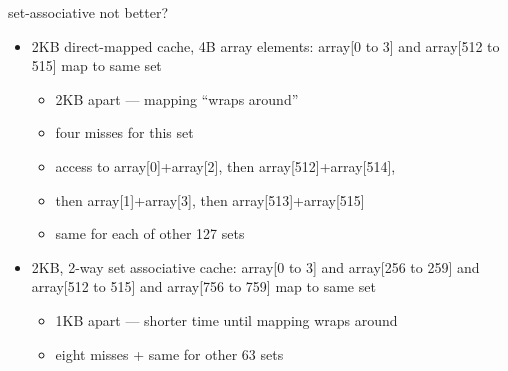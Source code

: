 
\begin{frame}[fragile,label=arrayMissesSetExplain]{set-associative not better?}
\begin{itemize}
\item 2KB direct-mapped cache, 4B array elements: array[0 to 3] and array[512 to 515] map to same set
    \begin{itemize}
    \item 2KB apart --- mapping ``wraps around''
    \item four misses for this set
    \item access to array[0]+array[2], then array[512]+array[514], 
    \item then array[1]+array[3], then array[513]+array[515]
    \item same for each of other 127 sets
    \end{itemize}
\item 2KB, 2-way set associative cache: array[0 to 3] and array[256 to 259] and array[512 to 515] and array[756 to 759] map to same set
    \begin{itemize}
    \item 1KB apart --- shorter time until mapping wraps around
    \item eight misses + same for other 63 sets
    \end{itemize}
\end{itemize}
\end{frame}
